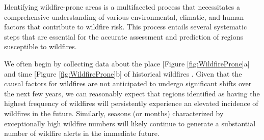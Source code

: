 \documentclass[
  12 pt,
]{Nemilov}
\begin{document}
Identifying wildfire-prone areas is a multifaceted process that necessitates a comprehensive understanding of various environmental, climatic, and human factors that contribute to wildfire risk. This process entails several systematic steps that are essential for the accurate assessment and prediction of regions susceptible to wildfires.

We often begin by collecting data about the place {[}Figure \ref{fig:WildfireProne}a{]} and time {[}Figure \ref{fig:WildfireProne}b{]} of historical wildfires \citep{fire-compendium22}. Given that the causal factors for wildfires are not anticipated to undergo significant shifts over the next few years, we can reasonably expect that regions identified as having the highest frequency of wildfires will persistently experience an elevated incidence of wildfires in the future. Similarly, seasons (or months) characterized by exceptionally high wildfire numbers will likely continue to generate a substantial number of wildfire alerts in the immediate future.
\end{document}

